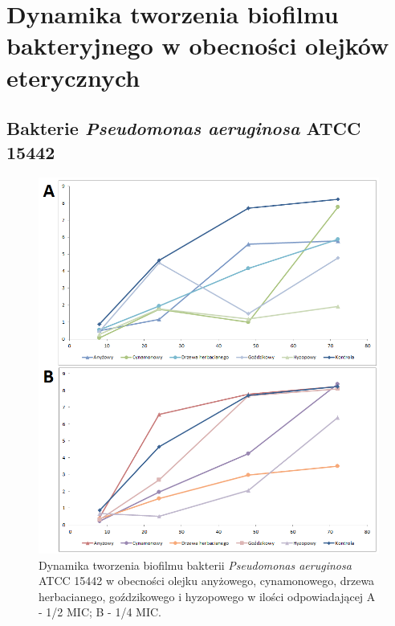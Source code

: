 \documentclass[11pt,a4paper]{report}
\begin{document}
\clearpage

\section{Dynamika tworzenia biofilmu bakteryjnego w obecności olejków eterycznych}

\subsection{Bakterie \textit{Pseudomonas aeruginosa} ATCC 15442} 

\begin{figure}[!h]
\begin{center}
\includegraphics[scale=0.60]{img/ref-a.png}
\caption{Dynamika tworzenia biofilmu bakterii \textit{Pseudomonas aeruginosa} ATCC 15442 w obecności olejku anyżowego, cynamonowego, drzewa herbacianego, goździkowego i hyzopowego w ilości odpowiadającej A - 1/2 MIC; B - 1/4 MIC.}\label{ref-a}
\end{center} 
\end{figure}
\end{document}

